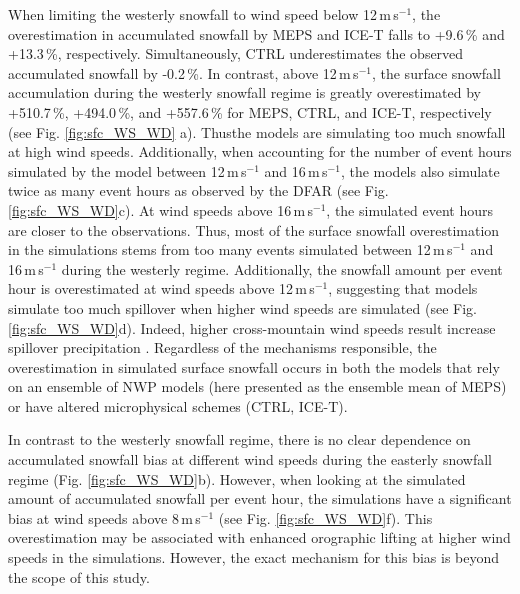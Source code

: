 \documentclass{ametsocV5}
\providecommand{\DIFadd}[1]{{\protect\color{blue}\uwave{#1}}} %
\providecommand{\DIFaddbegin}{} %
\providecommand{\DIFaddend}{} %
\newcommand{\DIFaddincludegraphics}[2][]{{\color{blue}\fbox{\DIFOincludegraphics[#1]{#2}}}} %
\DeclareRobustCommand{\DIFaddbegin}{\DIFOaddbegin \let\includegraphics\DIFaddincludegraphics} %
\DeclareRobustCommand{\DIFaddend}{\DIFOaddend \let\includegraphics\DIFOincludegraphics} %
\begin{document}
		When limiting the westerly snowfall to wind speed below 12\,m\,s$^{-1}$, the overestimation in accumulated snowfall by MEPS and ICE-T falls to +9.6\,\% and +13.3\,\%, respectively. Simultaneously, CTRL underestimates the observed accumulated snowfall by -0.2\,\%. In contrast, above 12\,m\,s$^{-1}$, the surface snowfall accumulation during the westerly snowfall regime is greatly overestimated by +510.7\,\%, +494.0\,\%, and +557.6\,\% for MEPS, CTRL, and ICE-T, respectively (see Fig. \ref{fig:sfc_WS_WD} a). Thus\DIFaddbegin \DIFadd{, }\DIFaddend the models are simulating too much snowfall at high wind speeds. Additionally, when accounting for the number of event hours simulated by the model between 12\,m\,s$^{-1}$ and 16\,m\,s$^{-1}$, the models also simulate twice as many event hours as observed by the DFAR (see Fig. \ref{fig:sfc_WS_WD}c). At wind speeds above 16\,m\,s$^{-1}$, the simulated event hours are closer to the observations. Thus, most of the surface snowfall overestimation in the simulations stems from too many events simulated between 12\,m\,s$^{-1}$ and 16\,m\,s$^{-1}$ during the westerly regime. Additionally, the snowfall amount per event hour is overestimated at wind speeds above 12\,m\,s$^{-1}$, suggesting that models simulate too much spillover when higher wind speeds are simulated (see Fig. \ref{fig:sfc_WS_WD}d). Indeed, higher cross-mountain wind speeds result increase spillover precipitation \citep{chater_atmospheric_1998,kaplan_role_2012}. Regardless of the mechanisms responsible, the overestimation in simulated surface snowfall occurs in both the models that rely on an ensemble of NWP models (here presented as the ensemble mean of MEPS) or have altered microphysical schemes (CTRL, ICE-T). 

		In contrast to the westerly snowfall regime, there is no clear dependence on accumulated snowfall bias at different wind speeds during the easterly snowfall regime (Fig. \ref{fig:sfc_WS_WD}b). 
		However, when looking at the simulated amount of accumulated snowfall per event hour, the simulations have a significant bias at wind speeds above 8\,m\,s$^{-1}$ (see Fig. \ref{fig:sfc_WS_WD}f). This overestimation may be associated with enhanced orographic lifting at higher wind speeds \DIFaddbegin \DIFadd{or due to fewer event hours }\DIFaddend in the simulations. However, the exact mechanism for this bias is beyond the scope of this study.
\end{document}
